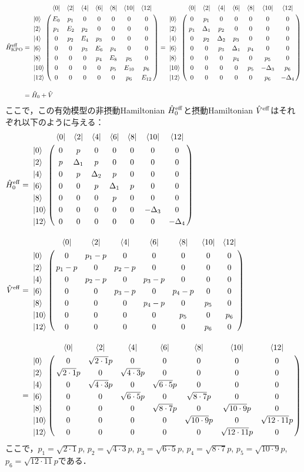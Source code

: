 \begin{align}
     \hat{H}_{\rm{KPO}}^{\rm{eff}}&=
   \bordermatrix{     
    & \bra{0} &  \bra{2} &  \bra{4}&  \bra{6}&  \bra{8} &\bra{10} &\bra{12}\cr
   \ket{0}&E_0&p_1&0&0&0&0&0\cr
  \ket{2}&p_1&E_2&p_2&0&0&0&0\cr
  \ket{4}&0&p_2&E_4&p_3&0&0&0\cr
  \ket{6}&0&0&p_3&E_6&p_4&0&0\cr
  \ket{8}&0&0&0&p_4&E_8&p_5&0\cr
  \ket{10}&0&0&0&0&p_5&E_{10}&p_6\cr
  \ket{12}&0&0&0&0&0&p_6&E_{12}\cr
            }
    =
   \bordermatrix{     
    & \bra{0} &  \bra{2} &  \bra{4}&  \bra{6}&  \bra{8} &\bra{10} &\bra{12}\cr
   \ket{0}&0&p_1&0&0&0&0&0\cr
  \ket{2}&p_1&\Delta_1&p_2&0&0&0&0\cr
  \ket{4}&0&p_2&\Delta_2&p_3&0&0&0\cr
  \ket{6}&0&0&p_3&\Delta_1&p_4&0&0\cr
  \ket{8}&0&0&0&p_4&0&p_5&0\cr
  \ket{10}&0&0&0&0&p_5&-\Delta_3&p_6\cr
  \ket{12}&0&0&0&0&0&p_6&-\Delta_4\cr
            }\nn[10pt]
    &=\hat{H}_0 + \hat{V} 
\end{align}
ここで，この有効模型の非摂動Hamiltonian $\hat{H}_0^{\rm{eff}}$と摂動Hamiltonian $\hat{V}^{\rm{eff}}$はそれぞれ以下のように与える：
\begin{align}
    \hat{H}_0^{\rm{eff}}&=\bordermatrix{
    & \bra{0} &  \bra{2} &  \bra{4}&  \bra{6}&  \bra{8} &\bra{10} &\bra{12}\cr
   \ket{0}&0&p&0&0&0&0&0\cr
  \ket{2}&p&\Delta_1&p&0&0&0&0\cr
  \ket{4}&0&p&\Delta_2&p&0&0&0\cr
  \ket{6}&0&0&p&\Delta_1&p&0&0\cr
  \ket{8}&0&0&0&p&0&0&0\cr
  \ket{10}&0&0&0&0&0&-\Delta_3&0\cr
  \ket{12}&0&0&0&0&0&0&-\Delta_4\cr}\nn[10pt]
  \hat{V}^{\rm{eff}}&=
   \bordermatrix{     
    & \bra{0} &  \bra{2} &  \bra{4}&  \bra{6}&  \bra{8} &\bra{10} &\bra{12}\cr
   \ket{0}&0&p_1-p&0&0&0&0&0\cr
  \ket{2}&p_1-p&0&p_2-p&0&0&0&0\cr
  \ket{4}&0&p_2-p&0&p_3-p&0&0&0\cr
  \ket{6}&0&0&p_3-p&0&p_4-p&0&0\cr
  \ket{8}&0&0&0&p_4-p&0&p_5&0\cr
  \ket{10}&0&0&0&0&p_5&0&p_6\cr
  \ket{12}&0&0&0&0&0&p_6&0\cr}\\[10pt]
    &=
   \bordermatrix{     
    & \bra{0} &  \bra{2} &  \bra{4}&  \bra{6}&  \bra{8} &\bra{10} &\bra{12}\cr
   \ket{0}&0&\sqrt{2\cdot1}p&0&0&0&0&0\cr
  \ket{2}&\sqrt{2\cdot1}p&0&\sqrt{4\cdot3}p&0&0&0&0\cr
  \ket{4}&0&\sqrt{4\cdot3}p&0&\sqrt{6\cdot5}p&0&0&0\cr
  \ket{6}&0&0&\sqrt{6\cdot5}p&0&\sqrt{8\cdot7}p&0&0\cr
  \ket{8}&0&0&0&\sqrt{8\cdot7}p&0&\sqrt{10\cdot9}p&0\cr
  \ket{10}&0&0&0&0&\sqrt{10\cdot9}p&0&\sqrt{12\cdot11}p\cr
  \ket{12}&0&0&0&0&0&\sqrt{12\cdot11}p&0\cr
            }
\end{align}
ここで，$p_1=\sqrt{2\cdot1}p$, $p_2=\sqrt{4\cdot3}p$, $p_3=\sqrt{6\cdot5}p$, $p_4=\sqrt{8\cdot7}p$, $p_5=\sqrt{10\cdot9}p$, $p_6=\sqrt{12\cdot11}p$である．


